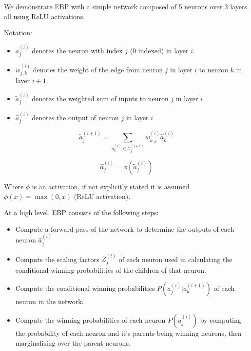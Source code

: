 \documentclass[A4paper,draft]{scrreprt}
\providecommand{\tightlist}{%
  \setlength{\itemsep}{0pt}\setlength{\parskip}{0pt}}
\newcommand{\neuron}[2]{a_{#2}^{(#1)}}
\newcommand{\neuronforward}[2]{\hat{a}_{#2}^{(#1)}}
\newcommand{\ebpscalar}[2]{Z_{#2}^{(#1)}}
\newcommand{\weight}[3]{w_{#2,#3}^{(#1)}}
\newcommand{\children}[2]{\mathscr{C}^{(#1)}_{#2}}
\newcommand{\cwp}[4]{P\left(\neuron{#1}{#2} | \neuron{#3}{#4}\right)}
\newcommand{\mwp}[2]{P\left(\neuron{#1}{#2}\right)}
\newcommand{\neuroninput}[2]{\tilde{a}^{(#1)}_{#2}}
\newcommand{\neuronoutput}[2]{\hat{a}^{(#1)}_{#2}}
\begin{document}
We demonstrate EBP with a simple network composed of 5 neurons over 3
layers all using ReLU activations.

Notation:

\begin{itemize}
\tightlist
\item
  \(\neuron{i}{j}\) denotes the neuron with index \(j\) (0 indexed) in
  layer \(i\).
\item
  \(\weight{i}{j}{k}\) denotes the weight of the edge from neuron \(j\)
  in layer \(i\) to neuron \(k\) in layer \(i + 1\).
\item
  \(\neuroninput{i}{j}\) denotes the weighted sum of inputs to neuron
  \(j\) in layer \(i\)
\item
  \(\neuronoutput{i}{j}\) denotes the output of neuron \(j\) in layer
  \(i\)
\end{itemize}

\begin{equation}
\label{eq:neuron-input}
\neuroninput{i + 1}{j} = \sum_{a_{k}^{(i)} \in \children{i + 1}{j}} \weight{i}{k}{j} \neuronoutput{i}{k}
\end{equation}

\begin{equation}
\label{eq:neuron-output}
\neuronoutput{i}{j} = \phi(\neuroninput{i}{j})
\end{equation}

Where \(\phi\) is an activation, if not explicitly stated it is assumed
\(\phi(x) = \max(0, x)\) (ReLU activation).

At a high level, EBP consists of the following steps:

\begin{itemize}
\tightlist
\item
  Compute a forward pass of the network to determine the outputs of each
  neuron \(\neuronforward{i}{j}\)
\item
  Compute the scaling factors \(\ebpscalar{i}{j}\) of each neuron used
  in calculating the conditional winning probabilities of the children
  of that neuron.
\item
  Compute the conditional winning probabilities \(\cwp{i}{j}{i + 1}{k}\)
  of each neuron in the network.
\item
  Compute the winning probabilities of each neuron \(\mwp{i}{j}\) by
  computing the probability of each neuron and it's parents being
  winning neurons, then marginalising over the parent neurons.
\end{itemize}
\end{document}

